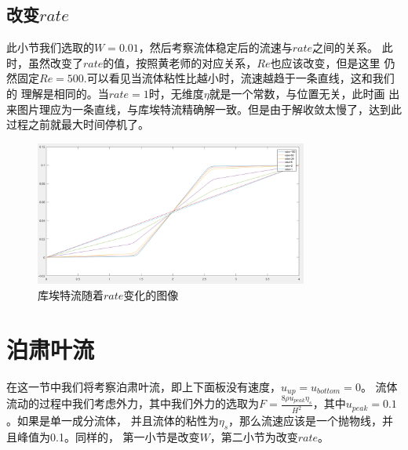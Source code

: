 \documentclass[11pt,UTF8]{ctexart}
\begin{document}
    \subsection{改变$rate$}
    \par{此小节我们选取的$W=0.01$，然后考察流体稳定后的流速与$rate$之间的关系。
    此时，虽然改变了$rate$的值，按照黄老师的对应关系，$Re$也应该改变，但是这里
    仍然固定$Re=500$.可以看见当流体粘性比越小时，流速越趋于一条直线，这和我们的
    理解是相同的。当$rate=1$时，无维度$\eta$就是一个常数，与位置无关，此时画
    出来图片理应为一条直线，与库埃特流精确解一致。但是由于解收敛太慢了，达到此
    过程之前就最大时间停机了。}
    \begin{figure}[h]
        \centerline{\includegraphics[width=0.8\textwidth]{cutte_rate.png}}
        \caption{库埃特流随着$rate$变化的图像}
    \end{figure}
    \section{泊肃叶流}
    \par{在这一节中我们将考察泊肃叶流，即上下面板没有速度，$u_{up}=u_{bottom}=0$。
    流体流动的过程中我们考虑外力，其中我们外力的选取为$F=\frac{8\rho u_{peak} \eta_s}{H^2}$，其中$u_{peak}=0.1$。如果是单一成分流体，
    并且流体的粘性为$\eta_s$，那么流速应该是一个抛物线，并且峰值为0.1。同样的，
    第一小节是改变$W$，第二小节为改变$rate$。}
\end{document}
